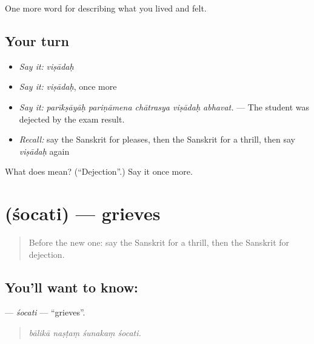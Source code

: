 \begin{grammarlens}[title={What you've built}]
One more word for describing what you lived and felt.
\end{grammarlens}

\subsection*{Your turn}
\begin{itemize}
\raggedright
  \item \emph{Say it:} \emph{viṣādaḥ}
  \item \emph{Say it:} \emph{viṣādaḥ}, once more
  \item \emph{Say it:} \emph{parīkṣāyāḥ pariṇāmena chātrasya viṣādaḥ abhavat.} — The student was dejected by the exam result.
  \item \emph{Recall:} say the Sanskrit for pleases, then the Sanskrit for a thrill, then say \emph{viṣādaḥ} again
\end{itemize}

\begin{tcolorbox}[breakable,colback=teal!4,colframe=teal!35!black,title={Before you move on}]
What does  mean? (\textquotedblleft{}Dejection\textquotedblright{}.) Say it once more.
\end{tcolorbox}
\section[\texorpdfstring{\sk{शोचति} (śocati)}{शोचति (śocati)}]{ (śocati) — grieves}

\label{lesson:SA-C450-socati}



\begin{quote}
Before the new one: say the Sanskrit for a thrill, then the Sanskrit for dejection.
\end{quote}

\subsection*{You'll want to know: }
\textbf{} — \emph{śocati} — \textquotedblleft{}grieves\textquotedblright{}.

\begin{quote}
   
\end{quote}

\begin{quote}
\emph{bālikā naṣṭaṃ śunakaṃ śocati.}
\end{quote}

